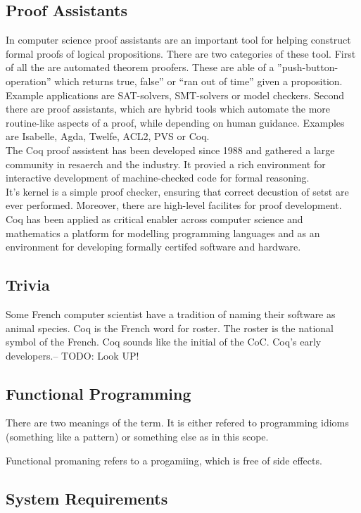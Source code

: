 \subsection{Proof Assistants}
In computer science proof assistants are an important tool for helping construct formal proofs of logical propositions.
There are two categories of these tool.
First of all the are automated theorem proofers. These are able of a ''push-button- operation'' which returns true, false'' or ``ran out of time'' given a proposition.
Example applications are SAT-solvers, SMT-solvers or model checkers. 
Second there are proof assistants, which are hybrid tools which automate the more routine-like aspects of a proof, while depending on human guidance. 
Examples are \gls{Isabelle}, Agda, Twelfe, ACL2, PVS or Coq.\\
The Coq proof assistent has been developed since 1988 and gathered a large community in resaerch and the industry.
It provied a rich environment for interactive development of machine-checked code for formal reasoning.\\
It's kernel is a simple proof checker, ensuring that correct decustion of setst are ever performed. Moreover, there are high-level facilites for proof development.
Coq has been applied as critical enabler across computer science and mathematics a platform for modelling programming languages and as an environment for developing formally certifed software and hardware.
 

\subsection{Trivia}
Some French computer scientist have a tradition of naming their software as animal species.
Coq is the French word for roster.
The roster is the national symbol of the French.
Coq sounds like the initial of the \gls{CoC}.
Coq's early developers.-- TODO: Look UP! 

\subsection{Functional Programming}
There are two meanings of the term. It is either refered to programming idioms (something like a pattern)
or something else as in this scope.

Functional promaning refers to a progamiing, which is free of side effects.

\subsection{System Requirements}



